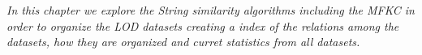 \textit{In this chapter we explore the String similarity algorithms including the MFKC\cite{valdestilhas2017high} in order to organize the LOD datasets creating a index of the relations among the datasets, how they are organized and curret statistics from all datasets.}

